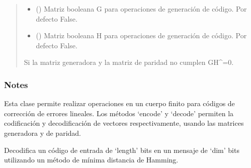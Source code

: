 \documentclass[letterpaper,10pt,english]{sphinxmanual}
\begin{document}
\begin{fulllineitems}
\begin{quote}
\begin{description}
\begin{itemize}
\item {} 
\sphinxAtStartPar
{} (\sphinxstyleliteralemphasis{\sphinxupquote{, }}) \textendash{} Matriz booleana G para operaciones de generación de código. Por defecto False.

\item {} 
\sphinxAtStartPar
{} (\sphinxstyleliteralemphasis{\sphinxupquote{, }}) \textendash{} Matriz booleana H para operaciones de generación de código. Por defecto False.

\end{itemize}

\sphinxAtStartPar
{} \textendash{} Si la matriz generadora y la matriz de paridad no cumplen GH\textasciicircum{}=0.

\end{description}\end{quote}
\subsubsection*{Notes}

\sphinxAtStartPar
Esta clase permite realizar operaciones en un cuerpo finito para códigos de corrección de errores lineales.
Los métodos ‘encode’ y ‘decode’ permiten la codificación y decodificación de vectores respectivamente,
usando las matrices generadora y de paridad.

\begin{fulllineitems}
\label{\detokenize{utils.bool:utils.bool.LinearSystECC.decode}}
\pysigstartsignatures
{}
\pysigstopsignatures
\sphinxAtStartPar
Decodifica un código de entrada de ‘length’ bits en un mensaje de ‘dim’ bits
utilizando un método de mínima distancia de Hamming.


\end{fulllineitems}
\end{fulllineitems}
\end{document}
